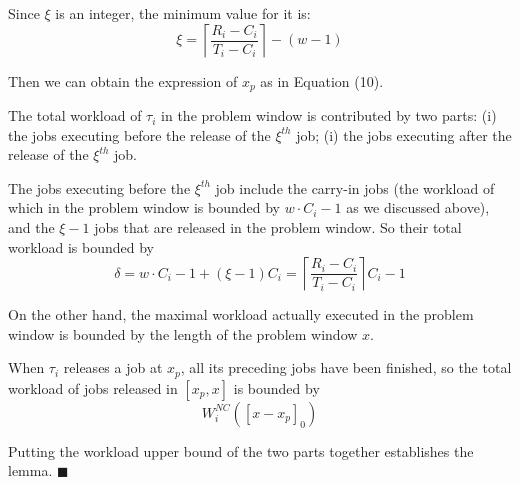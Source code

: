 Since $\xi$ is an integer, the minimum value for it is:
\[
\xi=\left\lceil \frac{R_i-C_i}{T_i-C_i} \right\rceil-(w-1)
\]

Then we can obtain the expression of $x_p$ as in Equation (10).

The total workload of $\tau_i$ in the problem window is contributed by two parts: (i) the jobs executing before the release of the $\xi^{th}$ job; (i) the jobs executing after the release of the $\xi^{th}$ job.

The jobs executing before the $\xi^{th}$ job include the carry-in jobs (the workload of which in the problem window is bounded by $w\cdot C_i-1$ as we discussed above), and the $\xi-1$ jobs that are released in the problem window. So their total workload is bounded by
\[
\delta=w\cdot C_i-1+(\xi-1)C_i=\left\lceil \frac{R_i-C_i}{T_i-C_i} \right\rceil C_i-1
\]

On the other hand, the maximal workload actually executed in the problem window is bounded by the length of the problem window $x$.

When $\tau_i$ releases a job at $x_p$, all its preceding jobs have been finished, so the total workload of jobs released in $[x_p,x]$ is bounded by
\[
W_i^{NC}([x-x_p]_0)
\]

Putting the workload upper bound of the two parts together establishes the lemma. \hfill $\blacksquare$